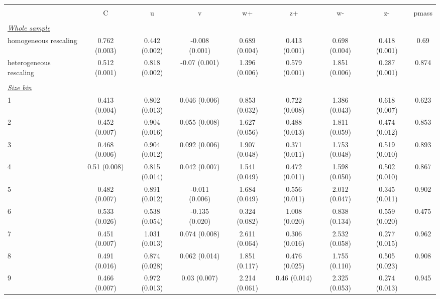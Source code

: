 
\begin{tabular}{@{\extracolsep{5pt}} l cccccccc} 
\\[-1.8ex]\hline 
\hline \\[-1.8ex] 
  & C & u & v & w+ & z+ & w- & z- & pmass \\ 
\hline \\[-1.8ex] 
\underline{{\it Whole sample}} &   &   &   &   &   &   &   &  \\ 
homogeneous rescaling & 0.762 (0.003) & 0.442 (0.002) & -0.008 (0.001) & 0.689 (0.004) & 0.413 (0.001) & 0.698 (0.004) & 0.418 (0.001) & 0.69 \\ 
heterogeneous rescaling & 0.512 (0.001) & 0.818 (0.002) & -0.07 (0.001) & 1.396 (0.006) & 0.579 (0.001) & 1.851 (0.006) & 0.287 (0.001) & 0.874 \\ 
 &   &   &   &   &   &   &   &  \\ 
\underline{{\it Size bin}} &   &   &   &   &   &   &   &  \\ 
1 & 0.413 (0.004) & 0.802 (0.013) & 0.046 (0.006) & 0.853 (0.032) & 0.722 (0.008) & 1.386 (0.043) & 0.618 (0.007) & 0.623 \\ 
2 & 0.452 (0.007) & 0.904 (0.016) & 0.055 (0.008) & 1.627 (0.056) & 0.488 (0.013) & 1.811 (0.059) & 0.474 (0.012) & 0.853 \\ 
3 & 0.468 (0.006) & 0.904 (0.012) & 0.092 (0.006) & 1.907 (0.048) & 0.371 (0.011) & 1.753 (0.048) & 0.519 (0.010) & 0.893 \\ 
4 & 0.51 (0.008) & 0.815 (0.014) & 0.042 (0.007) & 1.541 (0.049) & 0.472 (0.011) & 1.598 (0.050) & 0.502 (0.010) & 0.867 \\ 
5 & 0.482 (0.007) & 0.891 (0.012) & -0.011 (0.006) & 1.684 (0.049) & 0.556 (0.011) & 2.012 (0.047) & 0.345 (0.011) & 0.902 \\ 
6 & 0.533 (0.026) & 0.538 (0.054) & -0.135 (0.020) & 0.324 (0.082) & 1.008 (0.020) & 0.838 (0.134) & 0.559 (0.020) & 0.475 \\ 
7 & 0.451 (0.007) & 1.031 (0.013) & 0.074 (0.008) & 2.611 (0.064) & 0.306 (0.016) & 2.532 (0.058) & 0.277 (0.015) & 0.962 \\ 
8 & 0.491 (0.016) & 0.874 (0.028) & 0.062 (0.014) & 1.851 (0.117) & 0.476 (0.025) & 1.755 (0.110) & 0.505 (0.023) & 0.908 \\ 
9 & 0.466 (0.007) & 0.972 (0.013) & 0.03 (0.007) & 2.214 (0.061) & 0.46 (0.014) & 2.325 (0.053) & 0.274 (0.013) & 0.945 \\ 

\end{tabular}
